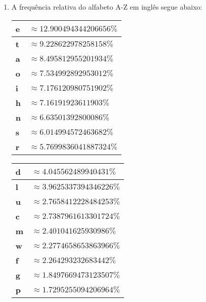 \documentclass{article}
\begin{document}
\begin{enumerate}
    \item A frequência relativa do alfabeto A-Z em inglês segue abaixo:
    \begin{center}
        \begin{minipage}{.32\linewidth}
            \begin{tabular}{ll}
                \hline
                \textbf{e} & $\approx 12.900494344206656\%$ \\ \hline
                \textbf{t} & $\approx 9.228622978258158\%$ \\ \hline
                \textbf{a} & $\approx 8.495812955201934\%$ \\ \hline
                \textbf{o} & $\approx 7.534992892953012\%$ \\ \hline
                \textbf{i} & $\approx 7.176120980751902\%$ \\ \hline
                \textbf{h} & $\approx 7.16191923611903\%$ \\ \hline
                \textbf{n} & $\approx 6.63501392800086\%$ \\ \hline
                \textbf{s} & $\approx 6.014994572463682\%$ \\ \hline
                \textbf{r} & $\approx 5.7699836041887324\%$ \\ \hline
            \end{tabular}
        \end{minipage}
        \begin{minipage}{.33\linewidth}
            \begin{tabular}{ll}
                \hline
                \textbf{d} & $\approx 4.045562489940431\%$ \\ \hline
                \textbf{l} & $\approx 3.9625337394346226\%$ \\ \hline
                \textbf{u} & $\approx 2.7658412228484253\%$ \\ \hline
                \textbf{c} & $\approx 2.7387961613301724\%$ \\ \hline
                \textbf{m} & $\approx 2.401041625930986\%$ \\ \hline
                \textbf{w} & $\approx 2.2774658653863966\%$ \\ \hline
                \textbf{f} & $\approx 2.264293232683442\%$ \\ \hline
                \textbf{g} & $\approx 1.8497669473123507\%$ \\ \hline
                \textbf{p} & $\approx 1.7295255094206964\%$ \\ \hline

\end{tabular}
\end{minipage}
\end{center}
\end{enumerate}
\end{document}
